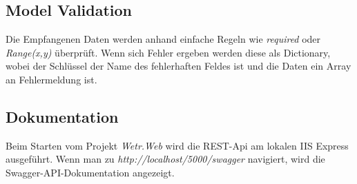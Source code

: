 \subsection{Model Validation}
Die Empfangenen Daten werden anhand einfache Regeln wie \textit{required} oder \textit{Range(x,y)} überprüft. Wenn sich Fehler ergeben werden diese als Dictionary, wobei der Schlüssel der Name des fehlerhaften Feldes ist und die Daten ein Array an Fehlermeldung ist.

\subsection{Dokumentation}
Beim Starten vom Projekt \textit{Wetr.Web} wird die REST-Api am lokalen IIS Express ausgeführt. Wenn man zu \textit{http://localhost/5000/swagger} navigiert, wird die Swagger-API-Dokumentation angezeigt.

